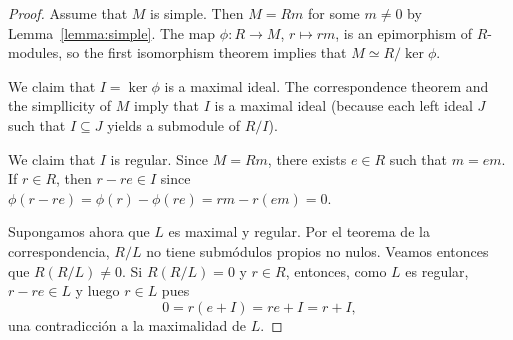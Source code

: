 \begin{proof}
	Assume that $M$ is simple. Then $M=Rm$ for some $m\ne0$ by 
	Lemma~\ref{lemma:simple}. The map $\phi\colon R\to M$, $r\mapsto rm$, 
	is an epimorphism of $R$-modules, so the first isomorphism theorem implies that 
	$M\simeq R/\ker\phi$. 
	
	We claim that $I=\ker\phi$ is a maximal ideal. The correspondence theorem 
	and the simpllicity of $M$ imply that $I$ is a maximal ideal (because each left ideal $J$ such that 
	$I\subseteq J$ yields a submodule of $R/I$).

	We claim that $I$ is regular. Since $M=Rm$, there exists $e\in R$ such that $m=em$. If
	$r\in R$, then $r-re\in I$ since 
	$\phi(r-re)=\phi(r)-\phi(re)=rm-r(em)=0$.

	Supongamos ahora que $L$ es maximal y regular.  Por el teorema de la
	correspondencia, $R/L$ no tiene submódulos propios no nulos. Veamos
	entonces que $R(R/L)\ne0$. Si $R(R/L)=0$ y $r\in R$, entonces, como $L$ es
	regular, $r-re\in L$ y luego $r\in L$ pues 
	\[
	0=r(e+I)=re+I=r+I,
	\]
	una contradicción a la maximalidad de $L$.
\end{proof}



